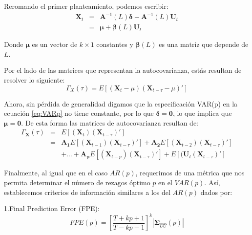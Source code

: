 \documentclass[
]{book}
\begin{document}
Reromando el primer planteamiento, podemos escribir:
\begin{eqnarray}
    \mathbf{X}_t & = & \mathbf{A}^{-1}(L) \boldsymbol{\delta} + \mathbf{A}^{-1}(L) \mathbf{U}_t \nonumber \\
    & = & \boldsymbol{\mu} + \boldsymbol{\beta}(L) \mathbf{U}_t
    \label{eq:VARMAq}
\end{eqnarray}

Donde \(\boldsymbol{\mu}\) es un vector de \(k \times 1\) constantes y
\(\boldsymbol{\beta}(L)\) es una matriz que depende de \(L\).

Por el lado de las matrices que representan la autocovarianza, estás
resultan de resolver lo siguiente: \begin{equation}
    \Gamma_X(\tau) = E[(\mathbf{X}_t - \mu)(\mathbf{X}_{t-\tau} - \mu)'] 
\end{equation}

Ahora, sin pérdida de generalidad digamos que la especificación VAR(p)
en la ecuación \eqref{eq:VARp} no tiene constante, por lo que
\(\boldsymbol{\delta} = \mathbf{0}\), lo que implica que
\(\boldsymbol{\mu} = \mathbf{0}\). De esta forma las matrices de
autocovarianza resultan de: \begin{eqnarray*}
    \Gamma_{\mathbf{X}}(\tau) & = & E[(\mathbf{X}_t)(\mathbf{X}_{t-\tau})'] \\
    & = & \mathbf{A_1} E[(\mathbf{X}_{t-1})(\mathbf{X}_{t-\tau})'] + \mathbf{A_2} E[(\mathbf{X}_{t-2})(\mathbf{X}_{t-\tau})'] \\
    &   & + \ldots + \mathbf{A_p} E[(\mathbf{X}_{t-p})(\mathbf{X}_{t-\tau})'] + E[(\mathbf{U}_t(\mathbf{X}_{t-\tau})']
\end{eqnarray*}

Finalmente, al igual que en el caso \(AR(p)\), requerimos de una métrica
que nos permita determinar el número de rezagos óptimo \(p\) en el
\(VAR(p)\). Así, establecemos criterios de información similares a los del
\(AR(p)\) dados por:

1.Final Prediction Error (FPE): \begin{equation}
        FPE(p) = \left[ \frac{T + kp + 1}{T - kp - 1} \right]^k |\mathbf{\Sigma}_{\hat{U}\hat{U}}(p)|
        \end{equation}
\end{document}
